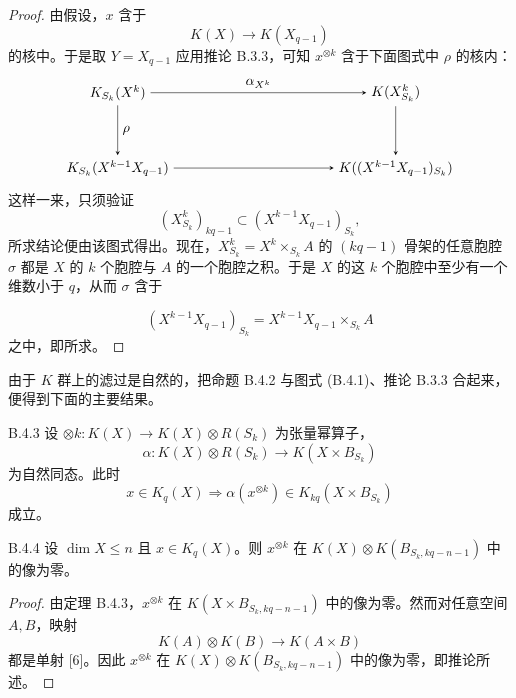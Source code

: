 \begin{proof}
  由假设，$x$ 含于
  \[
    K(X)\to K(X_{q-1})
  \]
  的核中。于是取 $Y=X_{q-1}$ 应用推论 B.3.3，可知 $x^{\otimes k}$ 含于下面图式中 $\rho$ 的核内：
  \begin{equation*}
    \begin{tikzpicture}[>=stealth, baseline=(current bounding box.center)]
      \node (A1) at (0,1.9) {$K_{S_k}(X^k)$};
      \node (B1) at (7.0,1.9) {$K(X^k_{S_k})$};
      \node (A2) at (0,0) {$K_{S_k}(X^{k-1}X_{q-1})$};
      \node (B2) at (7.0,0) {$K((X^{k-1}X_{q-1})_{S_k})$};
      \draw[->] (A1) -- node[above] {$\alpha_{X^k}$} (B1);
      \draw[->] (A1) -- node[right] {$\rho$} (A2);
      \draw[->] (B1) -- (B2);
      \draw[->] (A2) -- (B2);
    \end{tikzpicture}
  \end{equation*}
  这样一来，只须验证
  \[
    (X^k_{S_k})_{kq-1}\subset (X^{k-1}X_{q-1})_{S_k},
  \]
  所求结论便由该图式得出。现在，$X^k_{S_k}=X^k\times_{S_k}A$ 的 $(kq-1)$ 骨架的任意胞腔 $\sigma$ 都是 $X$ 的 $k$ 个胞腔与 $A$ 的一个胞腔之积。于是 $X$ 的这 $k$ 个胞腔中至少有一个维数小于 $q$，从而 $\sigma$ 含于

  \[
    (X^{k-1}X_{q-1})_{S_k}=X^{k-1}X_{q-1}\times_{S_k}A
  \]
  之中，即所求。
\end{proof}


由于 $K$ 群上的滤过是自然的，把命题 B.4.2 与图式 (B.4.1)、推论 B.3.3 合起来，便得到下面的主要结果。

\begin{theorem}{B.4.3}
  设 $\otimes k\colon K(X)\to K(X)\otimes R(S_k)$ 为张量幂算子，
  \[
    \alpha\colon K(X)\otimes R(S_k)\to K(X\times B_{S_k})
  \]
  为自然同态。此时
  \[
    x\in K_q(X)\Rightarrow\alpha(x^{\otimes k})\in K_{kq}(X\times B_{S_k})
  \]
  成立。
\end{theorem}

\begin{corollary*}{B.4.4}
  设 $\dim X\le n$ 且 $x\in K_q(X)$。则 $x^{\otimes k}$ 在 $K(X)\otimes K(B_{S_k,kq-n-1})$ 中的像为零。
\end{corollary*}

\begin{proof}
  由定理 B.4.3，$x^{\otimes k}$ 在 $K(X\times B_{S_k,kq-n-1})$ 中的像为零。然而对任意空间 $A,B$，映射
  \[
    K(A)\otimes K(B)\to K(A\times B)
  \]
  都是单射 [6]。因此 $x^{\otimes k}$ 在 $K(X)\otimes K(B_{S_k,kq-n-1})$ 中的像为零，即推论所述。
\end{proof}

